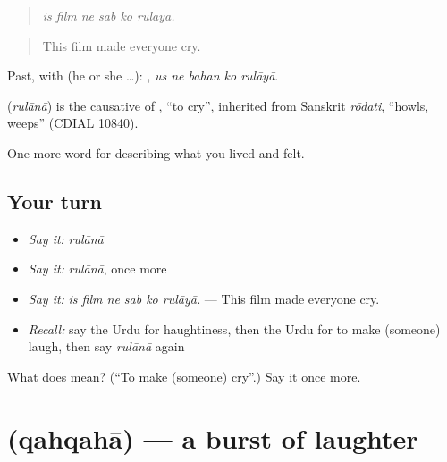 \begin{quote}
     
\end{quote}

\begin{quote}
\emph{is film ne sab ko rulāyā.}
\end{quote}

\begin{quote}
This film made everyone cry.
\end{quote}

Past, with  (he or she …):     , \emph{us ne bahan ko rulāyā}.

\begin{cousinweb}
\textbf{} (\emph{rulānā}) is the causative of \textbf{}, \textquotedblleft{}to cry\textquotedblright{}, inherited from Sanskrit \emph{rōdati}, \textquotedblleft{}howls, weeps\textquotedblright{} (CDIAL 10840).
\end{cousinweb}

\begin{grammarlens}[title={What you've built}]
One more word for describing what you lived and felt.
\end{grammarlens}

\subsection*{Your turn}
\begin{itemize}
\raggedright
  \item \emph{Say it:} \emph{rulānā}
  \item \emph{Say it:} \emph{rulānā}, once more
  \item \emph{Say it:} \emph{is film ne sab ko rulāyā.} — This film made everyone cry.
  \item \emph{Recall:} say the Urdu for haughtiness, then the Urdu for to make (someone) laugh, then say \emph{rulānā} again
\end{itemize}

\begin{tcolorbox}[breakable,colback=teal!4,colframe=teal!35!black,title={Before you move on}]
What does  mean? (\textquotedblleft{}To make (someone) cry\textquotedblright{}.) Say it once more.
\end{tcolorbox}
\section[\texorpdfstring{\ur{قہقہہ} (qahqahā)}{قہقہہ (qahqahā)}]{ (qahqahā) — a burst of laughter}

